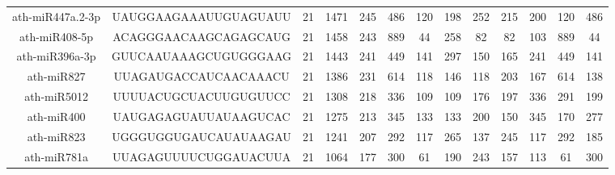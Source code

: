 \begin{landscape}
\begin{table}[]
\begin{tabular}{ccccccccccccc}
    ath-miR447a.2-3p & UAUGGAAGAAAUUGUAGUAUU    & 21           & 1471         & 245              & 486          & 120                          & 198                  & 252                  & 215                   & 200                   & 120                   & 486                   \\
    ath-miR408-5p    & ACAGGGAACAAGCAGAGCAUG    & 21           & 1458         & 243              & 889          & 44                           & 258                  & 82                   & 82                    & 103                   & 889                   & 44                    \\
    ath-miR396a-3p   & GUUCAAUAAAGCUGUGGGAAG    & 21           & 1443         & 241              & 449          & 141                          & 297                  & 150                  & 165                   & 241                   & 449                   & 141                   \\
    ath-miR827       & UUAGAUGACCAUCAACAAACU    & 21           & 1386         & 231              & 614          & 118                          & 146                  & 118                  & 203                   & 167                   & 614                   & 138                   \\
    ath-miR5012      & UUUUACUGCUACUUGUGUUCC    & 21           & 1308         & 218              & 336          & 109                          & 109                  & 176                  & 197                   & 336                   & 291                   & 199                   \\
    ath-miR400       & UAUGAGAGUAUUAUAAGUCAC    & 21           & 1275         & 213              & 345          & 133                          & 133                  & 200                  & 150                   & 345                   & 170                   & 277                   \\
    ath-miR823       & UGGGUGGUGAUCAUAUAAGAU    & 21           & 1241         & 207              & 292          & 117                          & 265                  & 137                  & 245                   & 117                   & 292                   & 185                   \\
    ath-miR781a      & UUAGAGUUUUCUGGAUACUUA    & 21           & 1064         & 177              & 300          & 61                           & 190                  & 243                  & 157                   & 113                   & 61                    & 300                   \\

\end{tabular}
\end{table}
\end{landscape}
